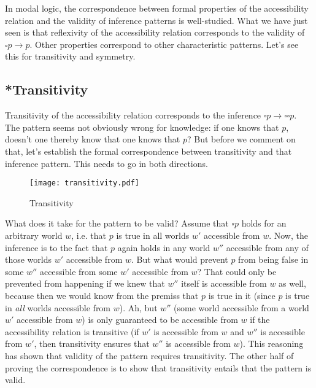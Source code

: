 In modal logic, the correspondence between formal properties of the
accessibility relation and the validity of inference patterns is well-studied.
What we have just seen is that reflexivity of the accessibility relation
corresponds to the validity of $\square p \rightarrow p$. Other properties
correspond to other characteristic patterns. Let's see this for transitivity and
symmetry.

\subsection{*Transitivity} \label{sec:transitivity}

Transitivity of the accessibility relation corresponds to the inference $\square
p \rightarrow \square \square p$.
The pattern seems not obviously wrong for knowledge: if one knows that $p$,
doesn't one thereby know that one knows that $p$? But before we comment on that,
let's establish the formal correspondence between transitivity and that
inference pattern. This needs to go in both directions.
  
\begin{figure}[htbp]
  \centering
    \texttt{[image: transitivity.pdf]}
  \caption{Transitivity}
  \label{fig:transitivity}
\end{figure}

\noindent What does it take for the pattern to be valid? Assume that $\square p$
holds for an arbitrary world $w$, i.e. that $p$ is true in all worlds $w'$
accessible from $w$. Now, the inference is to the fact that $p$ again holds in
any world $w''$ accessible from any of those worlds $w'$ accessible from $w$.
But what would prevent $p$ from being false in some $w''$ accessible from some
$w'$ accessible from $w$? That could only be prevented from happening if we knew
that $w''$ itself is accessible from $w$ as well, because then we would know
from the premiss that $p$ is true in it (since $p$ is true in \emph{all} worlds
accessible from $w$). Ah, but $w''$ (some world accessible from a world $w'$
accessible from $w$) is only guaranteed to be accessible from $w$ if the
accessibility relation is transitive (if $w'$ is accessible from $w$ and $w''$
is accessible from $w'$, then transitivity ensures that $w''$ is accessible from
$w$). This reasoning has shown that validity of the pattern requires
transitivity. The other half of proving the correspondence is to show that
transitivity entails that the pattern is valid.

